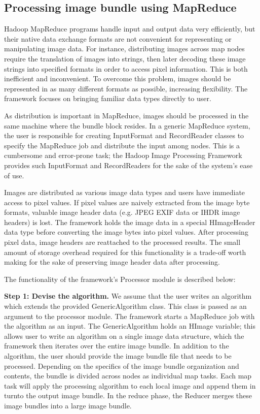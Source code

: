 \documentclass[conference]{IEEEtran}
\begin{document}
\subsection{Processing image bundle using MapReduce}
Hadoop MapReduce programs handle input and output data very
efficiently, but their native data exchange formats are not convenient
for representing or manipulating image data.  For instance,
distributing images across map nodes require the translation of images
into strings, then later decoding these image strings into specified
formats in order to access pixel information.  This is both
inefficient and inconvenient. To overcome this problem, images should
be represented in as many different formats as possible, increasing
flexibility. The framework focuses on bringing familiar data types
directly to user.

As distribution is important in MapReduce, images should be processed
in the same machine where the bundle block resides. In a generic
MapReduce system, the user is responsible for creating InputFormat and
RecordReader classes to specify the MapReduce job and distribute the
input among nodes. This is a cumbersome and error-prone task; the
Hadoop Image Processing Framework provides such InputFormat and
RecordReaders for the sake of the system's ease of use.

Images are distributed as various image data types and users have
immediate access to pixel values.  If pixel values are naively
extracted from the image byte formats, valuable image header data
(e.g. JPEG EXIF data or IHDR \cite{David03} image headers) is
lost. The framework holds the image data in a special HImageHeader
data type before converting the image bytes into pixel values.  After
processing pixel data, image headers are reattached to the processed
results.  The small amount of storage overhead required for this
functionality is a trade-off worth making for the sake of preserving
image header data after processing.

The functionality of the framework's Processor module is described
below:

\textbf{Step 1: Devise the algorithm.} We assume that the user writes
an algorithm which extends the provided GenericAlgorithm class. This
class is passed as an argument to the processor module. The framework
starts a MapReduce job with the algorithm as an input. The
GenericAlgorithm holds an HImage variable; this allows user to write
an algorithm on a single image data structure, which the framework
then iterates over the entire image bundle. In addition to the
algorithm, the user should provide the image bundle file that needs to
be processed.  Depending on the specifics of the image bundle
organization and contents, the bundle is divided across nodes as
individual map tasks. Each map task will apply the processing
algorithm to each local image and append them in turnto the output
image bundle. In the reduce phase, the Reducer merges these image
bundles into a large image bundle.
\end{document}
